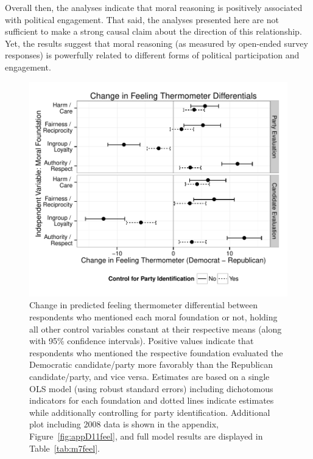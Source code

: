 \documentclass[12pt]{article}
\begin{document}
Overall then, the analyses indicate that moral reasoning is positively associated with political engagement. That said, the analyses presented here are not sufficient to make a strong causal claim about the direction of this relationship. Yet, the results suggest that moral reasoning (as measured by open-ended survey responses) is powerfully related to different forms of political participation and engagement.

\begin{figure}[h]\centering
\includegraphics[scale=.9]{../calc/fig/fig7feel.pdf}
\caption{Change in predicted feeling thermometer differential between respondents who mentioned each moral foundation or not, holding all other control variables constant at their respective means (along with 95\% confidence intervals). Positive values indicate that respondents who mentioned the respective foundation evaluated the Democratic candidate/party more favorably than the Republican candidate/party, and vice versa. Estimates are based on a single OLS model (using robust standard errors) including dichotomous indicators for each foundation and dotted lines indicate estimates while additionally controlling for party identification. Additional plot including 2008 data is shown in the appendix, Figure~\ref{fig:appD11feel}, and full model results are displayed in Table~\ref{tab:m7feel}.}\label{fig:7feel}
\end{figure}
\end{document}
